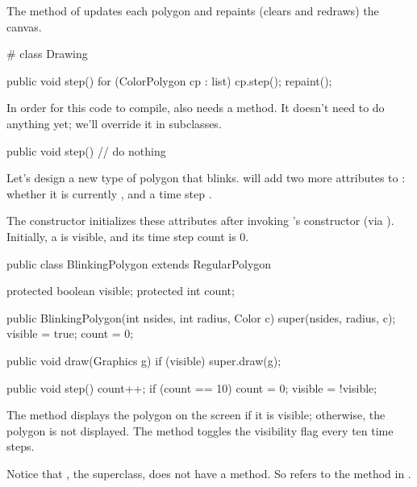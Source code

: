 The  method of  updates each polygon and repaints (clears and redraws) the canvas.

\begin{code}
# class Drawing

public void step() {
    for (ColorPolygon cp : list) {
        cp.step();
    }
    repaint();
}
\end{code}

In order for this code to compile,  also needs a  method.
It doesn't need to do anything yet; we'll override it in subclasses.

\begin{code}
public void step() {
    // do nothing
}
\end{code}

Let's design a new type of polygon that blinks.
 will add two more attributes to : whether it is currently , and a time step .

The constructor initializes these attributes after invoking 's constructor (via ).
Initially, a  is visible, and its time step count is 0.

\begin{code}
public class BlinkingPolygon extends RegularPolygon {
    protected boolean visible;
    protected int count;

    public BlinkingPolygon(int nsides, int radius, Color c) {
        super(nsides, radius, c);
        visible = true;
        count = 0;
    }

    public void draw(Graphics g) {
        if (visible) {
            super.draw(g);
        }
    }

    public void step() {
        count++;
        if (count == 10) {
            count = 0;
            visible = !visible;
        }
    }
}
\end{code}

The  method displays the polygon on the screen if it is visible;
otherwise, the polygon is not displayed.
The  method toggles the visibility flag every ten time steps.

Notice that , the superclass, does not have a  method.
So  refers to the  method in .



